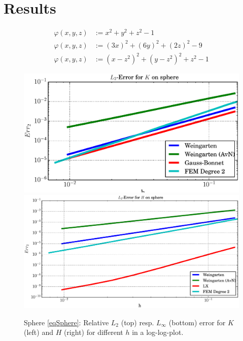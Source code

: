 \section{Results} \label{secResults}
  
  \begin{align}
    \label{eqSphere}
    \varphi\left( x,y,z \right) &:= x^{2} + y^{2} + z^{2} - 1 \\
    \label{eqEllipsoid}
    \varphi\left( x,y,z \right) &:= \left( 3x \right)^{2} + \left( 6y \right)^{2} + \left( 2z \right)^{2} - 9\\
    \label{eqQuartic}
    \varphi\left( x,y,z \right) &:= \left( x - z^{2} \right)^{2} + \left( y - z^{2} \right)^{2} + z^{2} - 1
  \end{align}


  \begin{figure}
    \centering\includegraphics[width=.49\textwidth]{bilder/sphere/L2K.eps}
    \centering\includegraphics[width=.49\textwidth]{bilder/sphere/L2H.eps}
    \caption{Sphere \eqref{eqSphere}: Relative \( L_{2} \) (top) resp. \( L_{\infty} \) (bottom) error for \( K \) (left) and
                                                     \( H \) (right) for different \( h \) in a log-log-plot.}
    \label{figSphere}
  \end{figure}

